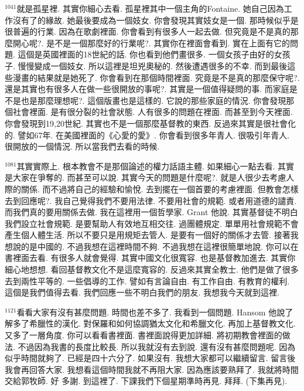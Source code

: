 \documentclass{book}
\begin{document}
$^{1041}$就是孤星裡.
其實你細心去看.
孤星裡其中一個主角的Fontaine.
她自己因為工作沒有了的緣故.
她最後要成為一個妓女.
你會發現其實妓女是一個.
那時候似乎是很普遍的行業.
因為在歌劇裡面.
你會看到有很多人一起去做.
但究竟是不是真的那麼開心呢?.
是不是一個那麼好的行業呢?.
其實你在裡面會看到.
實在上面有它的問題.
這個是英國裡面的18世紀的話.
你也看到他們畫很多.
一個女孩子由好的女孩子.
慢慢變成一個妓女.
所以這裡是坦兇奧秘的.
然後遭遇很多的不幸.
而到最後這些漫畫的結果就是她死了.
你會看到在那個時間裡面.
究竟是不是真的那麼保守呢?.
還是其實也有很多人在做一些很開放的事呢?.
其實是一個值得疑問的事.
而家庭是不是也是那麼理想呢?.
這個版畫也是這樣的.
它說的那些家庭的情況.
你會發現那個社會裡面.
是有很分裂的社會狀態.
人有很多的問題在裡面.
而甚至到今天裡面.
你會發現到19,20世紀.
其實也不是一個那麼基督教的東西.
反過來其實是很社會化的.
譬如67年.
在美國裡面的《心愛的愛》.
你會看到很多年青人.
很吸引年青人.
很開放的一個情況.
所以當我們去看的時候.

$^{1081}$其實實際上.
根本教會不是那個論述的權力話語主體.
如果細心一點去看.
其實是大家在爭奪的.
而甚至可以說.
其實今天的問題是什麼呢?.
就是人很少去考慮人際的關係.
而不過將自己的經驗和愉悅.
去到擺在一個首要的考慮裡面.
但教會怎樣去到回應呢?.
我自己覺得我們不要用法律.
不要用社會的規範.
或者用道德的譴責.
而我們真的要用關係去做.
我在這裡用一個哲學家.
Grant 他說.
其實基督徒不明白我們設立社會規範.
是要幫助人有效地互相交往.
過團體規定.
單單用社會規範不會產生個人體生活.
所以不要只是用規矩去管人.
是要有一個好的關係才去管.
接著我想說的是中國的.
不過我想在這裡時間不夠.
不過我想在這裡很簡單地說.
你可以在書裡面去看.
有很多人就會覺得.
其實中國文化很寬容.
也是基督教加進去.
其實你細心地想想.
看回基督教文化不是這麼寬容的.
反過來其實全教士.
他們是做了很多去到兩性平等的.
一些倡導的工作.
譬如有言論自由.
有工作自由.
有教育的權利.
這個是我們值得去看.
我們回應一些不明白我們的朋友.
我想我今天就到這裡.

$^{1121}$看看大家有沒有甚麼問題.
時間也差不多了.
我看到一個問題.
Hansom 他說了解多了希臘性的漢化.
對保羅和如何協調猶太文化和希臘文化.
再加上基督教文化.
又多了一層角度.
你可以看看書裡面.
書裡面說得更加詳細.
將初期教會裡面的做法.
不過因為我書的長度比較長.
所以我就沒有去到說.
還有沒有甚麼問題呢.
因為似乎時間就夠了.
已經是四十六分了.
如果沒有.
我想大家都可以繼續留言.
留言後我會再回答大家.
我想看這個時間我就不再阻大家.
因為應該要熟拜了.
我就將時間交給郭牧師.
好 多謝.
到這裡了.
下課我們下個星期準時再見.
拜拜.
(下集再見).
\newpage
\end{document}
